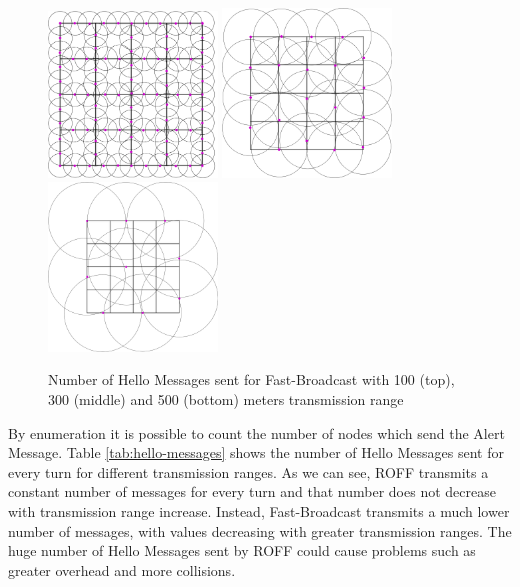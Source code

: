 		\begin{figure}[H]
			\centering
			\includegraphics[width=0.4\textwidth]{immagini/hello-100}
			\includegraphics[width=0.4\textwidth]{immagini/hello-300}
			\includegraphics[width=0.4\textwidth]{immagini/hello-500}
			\caption{Number of Hello Messages sent for Fast-Broadcast with 100 (top), 300 (middle) and 500 (bottom) meters transmission range}
			\label{fig:hello-fb}
		\end{figure}
		
		By enumeration it is possible to count the number of nodes which send the Alert Message. Table \ref{tab:hello-messages} shows the number of Hello Messages sent for every turn for different transmission ranges. As we can see, ROFF transmits a constant number of messages for every turn and that number does not decrease with transmission range increase. Instead, Fast-Broadcast transmits a much lower number of messages, with values decreasing with greater transmission ranges. The huge number of Hello Messages sent by ROFF could cause problems such as greater overhead and more collisions.
		

